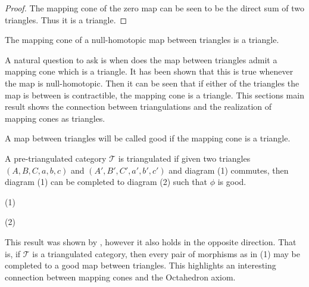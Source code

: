     \begin{proof}
        The mapping cone of the zero map can be seen to be the direct sum of two triangles. Thus it is a triangle.
    \end{proof}

    \begin{corollary}
        The mapping cone of a null-homotopic map between triangles is a triangle.
    \end{corollary}

    A natural question to ask is when does the map between triangles admit a mapping cone which is a triangle. It has been shown that this is true whenever the map is null-homotopic. Then it can be seen that if either of the triangles the map is between is contractible, the mapping cone is a triangle. This sections main result shows the connection between triangulations and the realization of mapping cones as triangles.

    \begin{definition}
        A map between triangles will be called good if the mapping cone is a triangle.
    \end{definition}

    \begin{theorem}
        A pre-triangulated category $\mathcal{T}$ is triangulated if given two triangles $(A,B,C,a,b,c)$ and $(A',B',C',a',b',c')$ and diagram (1) commutes, then diagram (1) can be completed to diagram (2) such that $\phi$ is good.
        \begin{center}
            (1)
            (2)
        \end{center}
    \end{theorem}

    This result was shown by \cite{neeman}, however it also holds in the opposite direction. That is, if $\mathcal{T}$ is a triangulated category, then every pair of morphisms as in (1) may be completed to a good map between triangles. This highlights an interesting connection between mapping cones and the Octahedron axiom. 

